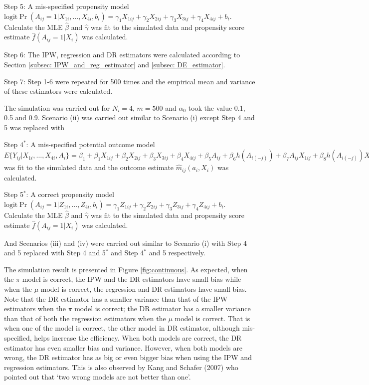 \documentclass[oupdraft]{bio}
\begin{document}
\noindent \hangindent=1.5cm Step 5: A mis-specified propensity model $\mbox{logit}\Pr(A_{ij}=1|X_{1i},\ldots,X_{4i},b_i)=
\gamma_1X_{1ij}+\gamma_2X_{2ij}+\gamma_3X_{3ij}+\gamma_4X_{4ij}+b_i$.
 Calculate the MLE $\hat{\beta}$ and $\hat{\gamma}$ was fit to the simulated data and propensity score estimate $\hat{f}(A_{ij}=1|X_i)$ was calculated.


\noindent \hangindent=1.5cm Step 6: The IPW, regression and DR estimators were calculated according to Section \ref{subsec: IPW_and_reg_estimator} and \ref{subsec: DE_estimator}.

\noindent \hangindent=1.5cm Step 7: Step 1-6 were repeated for 500 times and the empirical mean and variance of these estimators were calculated.

\noindent The simulation was carried out for $N_i=4$, $m=500$ and $\alpha_0$ took the value 0.1, 0.5 and 0.9. Scenario (ii) was carried out similar to Scenario (i) except Step 4 and 5 was replaced with

\noindent \hangindent=1.5cm Step 4$^{*}$: A mis-specified potential outcome model $E\{Y_{ij}|X_{1i},\ldots,X_{4i},A_i\}=\beta_1+
\beta_1X_{1ij}+\beta_2X_{2ij}+\beta_3X_{3ij}+\beta_4X_{4ij}+\beta_5A_{ij}+
\beta_6h(A_{i(-j)})+\beta_7A_{ij}X_{1ij}+\beta_8h(A_{i(-j)})X_{2ij}
$ was fit to the simulated data and the outcome estimate $\hat{m}_{ij}(a_i,X_i)$ was calculated. 

\noindent \hangindent=1.5cm Step 5$^{*}$: A correct propensity model $\mbox{logit}\Pr(A_{ij}=1|Z_{1i},\ldots,Z_{4i},b_i)=
\gamma_1Z_{1ij}+\gamma_2Z_{2ij}+\gamma_3Z_{3ij}+\gamma_4Z_{4ij}+b_i$.
 Calculate the MLE $\hat{\beta}$ and $\hat{\gamma}$ was fit to the simulated data and propensity score estimate $\hat{f}(A_{ij}=1|X_i)$ was calculated.


\noindent And Scenarios (iii) and (iv) were carried out similar to Scenario (i) with Step 4 and 5 replaced with Step 4 and 5$^{*}$ and Step 4$^{*}$ and 5 respectively. 

The simulation result is presented in Figure \ref{fig:continuous}. As expected, when the $\pi$ model is correct, the IPW and the DR estimators have small bias while when the $\mu$ model is correct, the regression and DR estimators have small bias. Note that the DR estimator has a smaller variance than that of the IPW estimators when the $\pi$ model is correct; the DR estimator has a smaller variance than that of both the regression estimators when the $\mu$ model is correct. That is when one of the model is correct, the other model in DR estimator, although mis-specified, helps increase the efficiency. When both models are correct, the DR estimator has even smaller bias and variance. However, when both models are wrong, the DR estimator has as big or even bigger bias when using the IPW and regression estimators. This is also observed by Kang and Schafer (2007)\nocite{kang2007demystifying} who pointed out that `two wrong models are not better than one'.
\end{document}
